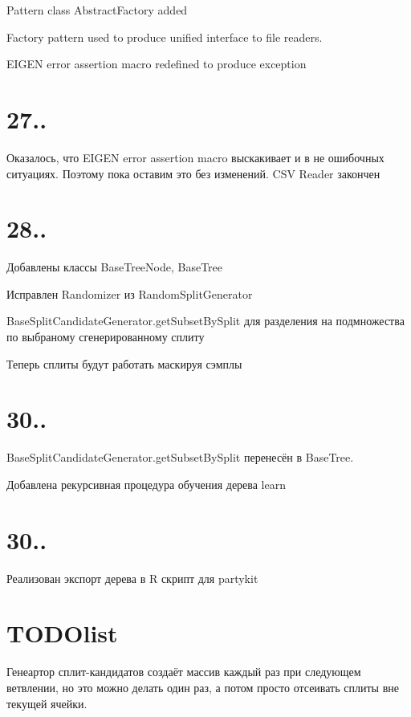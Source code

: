 Pattern class Abstract\-Factory added

Factory pattern used to produce unified interface to file readers.

E\-I\-G\-E\-N error assertion macro redefined to produce exception\hypertarget{_detailed_five_sec}{}\section{27..}\label{_detailed_five_sec}
Оказалось, что E\-I\-G\-E\-N error assertion macro выскакивает и в не ошибочных ситуациях. Поэтому пока оставим это без изменений. C\-S\-V Reader закончен\hypertarget{_detailed_six_sec}{}\section{28..}\label{_detailed_six_sec}
Добавлены классы Base\-Tree\-Node, Base\-Tree

Исправлен Randomizer из Random\-Split\-Generator

Base\-Split\-Candidate\-Generator.\-get\-Subset\-By\-Split для разделения на подмножества по выбраному сгенерированному сплиту

Теперь сплиты будут работать маскируя сэмплы\hypertarget{_detailed_seven_sec}{}\section{30..}\label{_detailed_seven_sec}
Base\-Split\-Candidate\-Generator.\-get\-Subset\-By\-Split перенесён в Base\-Tree.

Добавлена рекурсивная процедура обучения дерева learn\hypertarget{_detailed_seven_sec}{}\section{30..}\label{_detailed_seven_sec}
Реализован экспорт дерева в R скрипт для partykit 

 \hypertarget{_detailed_todo_sec}{}\section{T\-O\-D\-Olist}\label{_detailed_todo_sec}
Генеартор сплит-\/кандидатов создаёт массив каждый раз при следующем ветвлении, но это можно делать один раз, а потом просто отсеивать сплиты вне текущей ячейки.



 